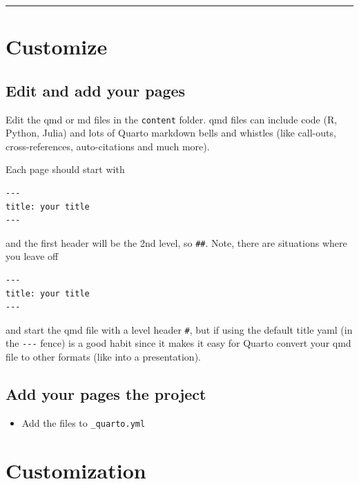 \documentclass[
  letterpaper,
  oneside,
  open=any]{scrbook}
\providecommand{\tightlist}{%
  \setlength{\itemsep}{0pt}\setlength{\parskip}{0pt}}\usepackage{longtable,booktabs,array}
\begin{document}
\begin{center}\rule{0.5\linewidth}{0.5pt}\end{center}


\chapter{Customize}\label{customize}

\section{Edit and add your pages}\label{edit-and-add-your-pages}

Edit the qmd or md files in the \texttt{content} folder. qmd files can
include code (R, Python, Julia) and lots of Quarto markdown bells and
whistles (like call-outs, cross-references, auto-citations and much
more).

Each page should start with

\begin{verbatim}
---
title: your title
---
\end{verbatim}

and the first header will be the 2nd level, so \texttt{\#\#}. Note,
there are situations where you leave off

\begin{verbatim}
---
title: your title
---
\end{verbatim}

and start the qmd file with a level header \texttt{\#}, but if using the
default title yaml (in the \texttt{-\/-\/-} fence) is a good habit since
it makes it easy for Quarto convert your qmd file to other formats (like
into a presentation).

\section{Add your pages the project}\label{add-your-pages-the-project}

\begin{itemize}
\tightlist
\item
  Add the files to \texttt{\_quarto.yml}
\end{itemize}


\chapter{Customization}\label{customization}
\end{document}
